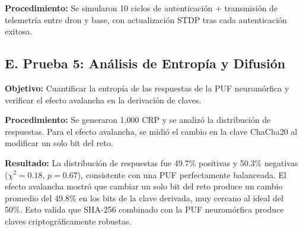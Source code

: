 \textbf{Procedimiento:} Se simularon 10 ciclos de autenticación + transmisión de telemetría entre dron y base, con actualización STDP tras cada autenticación exitosa.

\begin{table}[H]
    \centering\footnotesize\setlength{\tabcolsep}{3pt}
    \caption{Telemetría transmitida con cifrado multicapa}
    \label{tab:telemetry-neuro}
\end{table}

\subsection*{E. Prueba 5: Análisis de Entropía y Difusión}

\textbf{Objetivo:} Cuantificar la entropía de las respuestas de la PUF neuromórfica y verificar el efecto avalancha en la derivación de claves.

\textbf{Procedimiento:} Se generaron 1,000 CRP y se analizó la distribución de respuestas. Para el efecto avalancha, se midió el cambio en la clave ChaCha20 al modificar un solo bit del reto.

\textbf{Resultado:} La distribución de respuestas fue 49.7\% positivas y 50.3\% negativas ($\chi^2 = 0.18$, $p = 0.67$), consistente con una PUF perfectamente balanceada. El efecto avalancha mostró que cambiar un solo bit del reto produce un cambio promedio del 49.8\% en los bits de la clave derivada, muy cercano al ideal del 50\%. Esto valida que SHA-256 combinado con la PUF neuromórfica produce claves criptográficamente robustas.

